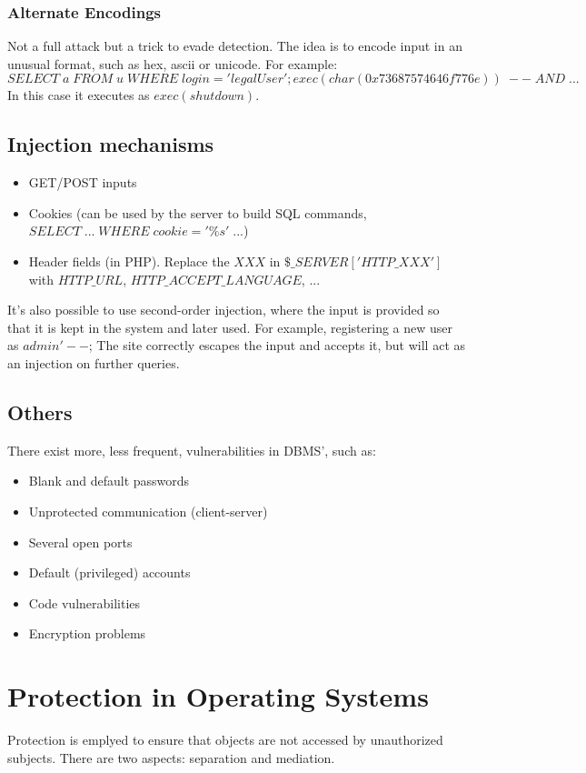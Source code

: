 \documentclass[10pt,a4paper]{report}
\begin{document}
\subsubsection{Alternate Encodings}
Not a full attack but a trick to evade detection. The idea is to encode input in an unusual format, such as hex, ascii or unicode. For example: 
$$
SELECT \; a \; FROM \; u \; WHERE \; login='legalUser';exec(char(0x73687574646f776e))\; --\; AND\; ...
$$
In this case it executes as $exec(shutdown)$.
\subsection{Injection mechanisms}
\begin{itemize}
\item GET/POST inputs
\item Cookies (can be used by the server to build SQL commands, $SELECT \; ... \; WHERE \; cookie='\%s'\; ...$)
\item Header fields (in PHP). Replace the $XXX$ in $\$\_SERVER['HTTP\_XXX']$ with $HTTP\_URL$, $HTTP\_ACCEPT\_LANGUAGE$, ...
\end{itemize}
It's also possible to use second-order injection, where the input is provided so that it is kept in the system and later used. For example, registering a new user as $admin'--$; The site correctly escapes the input and accepts it, but will act as an injection on further queries.
\subsection{Others}
There exist more, less frequent, vulnerabilities in DBMS', such as:
\begin{itemize}
\item Blank and default passwords
\item Unprotected communication (client-server)
\item Several open ports
\item Default (privileged) accounts
\item Code vulnerabilities
\item Encryption problems
\end{itemize}

\section{Protection in Operating Systems}
Protection is emplyed to ensure that objects are not accessed by unauthorized subjects. There are two aspects: separation and mediation.
\end{document}
